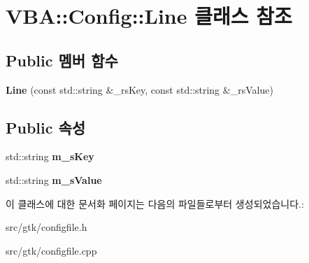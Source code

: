 \hypertarget{class_v_b_a_1_1_config_1_1_line}{}\section{V\+BA\+:\+:Config\+:\+:Line 클래스 참조}
\label{class_v_b_a_1_1_config_1_1_line}
\subsection*{Public 멤버 함수}
\begin{DoxyCompactItemize}
\item 
\mbox{\label{class_v_b_a_1_1_config_1_1_line_a79482ad95747330d0b31e862410a2e41}} 
{\bfseries Line} (const std\+::string \&\+\_\+rs\+Key, const std\+::string \&\+\_\+rs\+Value)
\end{DoxyCompactItemize}
\subsection*{Public 속성}
\begin{DoxyCompactItemize}
\item 
\mbox{\label{class_v_b_a_1_1_config_1_1_line_a24c2691b23a1e55614f5c7f493199fa0}} 
std\+::string {\bfseries m\+\_\+s\+Key}
\item 
\mbox{\label{class_v_b_a_1_1_config_1_1_line_a49ce629848d486c0a3f0ee4e5d7d015a}} 
std\+::string {\bfseries m\+\_\+s\+Value}
\end{DoxyCompactItemize}


이 클래스에 대한 문서화 페이지는 다음의 파일들로부터 생성되었습니다.\+:\begin{DoxyCompactItemize}
\item 
src/gtk/configfile.\+h\item 
src/gtk/configfile.\+cpp\end{DoxyCompactItemize}
